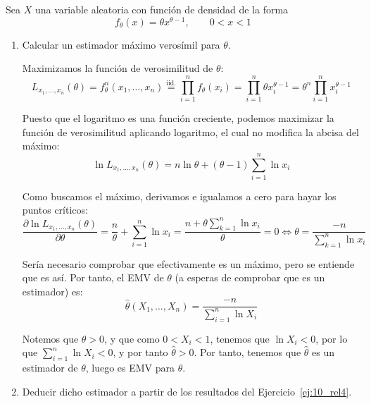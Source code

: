 \begin{ejercicio}
    Sea $X$ una variable aleatoria con función de densidad de la forma
    \begin{equation*}
        f_\theta(x) = \theta x^{\theta -1}, \qquad 0<x<1
    \end{equation*}
    \begin{enumerate}[label=\alph*)]
        \item Calcular un estimador máximo verosímil para $\theta$.

            Maximizamos la función de verosimilitud de $\theta$:
            \begin{equation*}
                L_{x_1,\ldots,x_n}(\theta) = f^n_\theta(x_1, \ldots, x_n) \stackrel{\text{iid.}}{=}\prod_{i=1}^{n}f_\theta(x_i) = \prod_{i=1}^{n} \theta x_i^{\theta-1} = \theta^n \prod_{i=1}^{n} x_i^{\theta -1}
            \end{equation*}

            Puesto que el logaritmo es una función creciente, podemos maximizar la función de verosimilitud aplicando logaritmo, el cual no modifica la abcisa del máximo:
            \begin{equation*}
                \ln L_{x_1,\ldots,x_n}(\theta) = n\ln \theta + (\theta -1)\sum_{i=1}^{n} \ln x_i
            \end{equation*}

            Como buscamos el máximo, derivamos e igualamos a cero para hayar los puntos críticos:
            \begin{equation*}
                \dfrac{\partial \ln L_{x_1,\ldots,x_n}(\theta)}{\partial  \theta} = \frac{n}{\theta} + \sum_{i=1}^{n}\ln x_i = \frac{n + \theta \sum\limits_{k=1}^{n}\ln x_i}{\theta} = 0 \Longleftrightarrow \theta = \frac{-n}{\sum\limits_{k=1}^{n}\ln x_i}
            \end{equation*}

            Sería necesario comprobar que efectivamente es un máximo, pero se entiende que es así. Por tanto, el EMV de $\theta$ (a esperas de comprobar que es un estimador) es:
            \begin{equation*}
                \widehat{\theta}(X_1, \ldots, X_n) = \frac{-n}{\sum\limits_{i=1}^{n} \ln X_i}
            \end{equation*}

            Notemos que $\theta>0$, y que como $0<X_i<1$, tenemos que $\ln X_i < 0$, por lo que $\sum\limits_{i=1}^{n}\ln X_i < 0$, y por tanto $\widehat{\theta} > 0$. Por tanto, tenemos que $\widehat{\theta}$ es un estimador de $\theta$, luego es EMV para $\theta$.
        \item Deducir dicho estimador a partir de los resultados del Ejercicio~\ref{ej:10_rel4}.


\end{enumerate}
\end{ejercicio}
